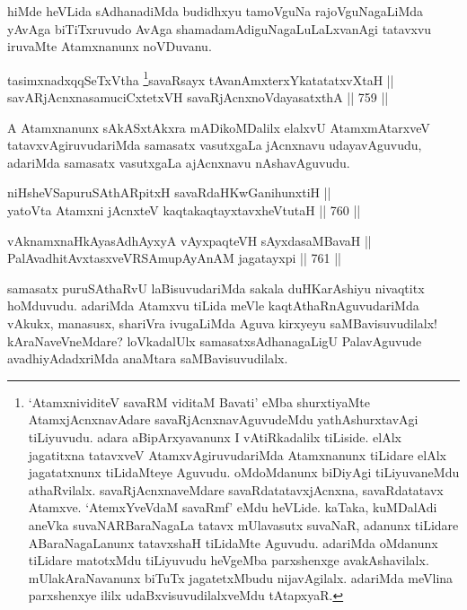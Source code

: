 \begin{artha} 
hiMde heVLida sAdhanadiMda budidhxyu tamoVguNa rajoVguNagaLiMda yAvAga 
biTiTxruvudo AvAga shamadamAdiguNagaLuLaLxvanAgi tatavxvu iruvaMte 
Atamxnanunx noVDuvanu.
\end{artha}

\begin{shl}
tasimxnadxqqSeTxV\s tha \footnote{`AtamxnividiteV savaRM viditaM Bavati' eMba shurxtiyaMte AtamxjAcnxnavAdare savaRjAcnxna\-vAguvudeMdu yathAshurxtavAgi tiLiyuvudu. adara aBipArxyavanunx I vAtiRkadalilx tiLiside. elAlx jagatitxna tatavxveV AtamxvAgiruvudariMda Atamxnanunx tiLidare elAlx jagatatxnunx tiLidaMteye Aguvudu. oMdoMdanunx biDiyAgi tiLiyuvaneMdu athaRvilalx. savaRjAcnxnaveMdare savaRdatatavxjAcnxna, savaRdatatavx Atamxve. `AtemxYveVdaM savaRmf' eMdu heVLide. kaTaka, kuMDalAdi aneVka suvaNAR\break BaraNagaLa tatavx mUlavasutx suvaNaR, adanunx tiLidare ABaraNagaLanunx tatavxshaH tiLidaMte Aguvudu. adariMda oMdanunx tiLidare matotxMdu tiLiyuvudu heVgeMba parxshenxge avakAshavilalx.\\mUlakAraNavanunx biTuTx jagatetxMbudu nijavAgilalx. adariMda meVlina parxshenxye ililx udaBxvisuvudilalxveMdu tAtapxyaR.}savaRsayx tAvanAmxterxYkatatatxvXtaH || \\
savARjAcnxnasamuciCxtetxVH savaRjAcnxnoVdayasatxthA \hfill || 759 ||  
\end{shl}

\begin{artha} 
A Atamxnanunx sAkASxtAkxra mADikoMDalilx elalxvU AtamxmAtarxveV 
tatavxvAgiruvudariMda samasatx vasutxgaLa jAcnxnavu udayavAguvudu, 
adariMda samasatx vasutxgaLa ajAcnxnavu nAshavAguvudu.
\end{artha}


\begin{shl}
niHsheVSapuruSAthARpitxH savaRdaHKwGanihunxtiH || \\
yatoV\s ta Atamxni jAcnxteV kaqtakaqtayxtavxheVtutaH \hfill || 760 ||  
\end{shl}
				
\begin{shl}
vAknamxnaHkAyasAdhAyxyA vAyxpaqteVH sAyxdasaMBavaH || \\
PalAvadhitAvxtasxveVRSAmupAyAnAM jagatayxpi \hfill || 761 ||  
\end{shl}

\begin{artha} 
samasatx puruSAthaRvU laBisuvudariMda sakala duHKarAshiyu nivaqtitx hoMduvudu. adariMda Atamxvu tiLida meVle kaqtAthaRnAguvudariMda vAkukx, manasusx, shariVra ivugaLiMda Aguva kirxyeyu saMBavisuvudilalx! kAraNaveVneMdare? loVkadalUlx samasatx\break sAdhanagaLigU PalavAguvude avadhiyAdadxriMda anaMtara saMBavisuvudilalx.
\end{artha}

